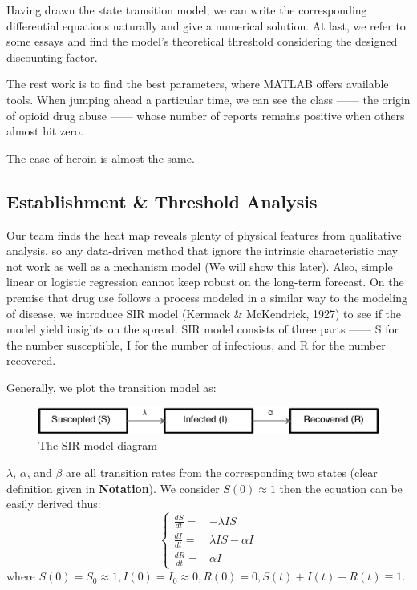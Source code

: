 \documentclass{mcmthesis}
\begin{document}
Having drawn the state transition model, we can write the corresponding differential equations naturally and give a numerical solution. At last, we refer to some essays and find the model's theoretical threshold considering the designed discounting factor. 

The rest work is to find the best parameters, where MATLAB offers available tools. When jumping ahead a particular time, we can see the class —— the origin of opioid drug abuse —— whose number of reports remains positive when others almost hit zero. 

The case of heroin is almost the same.
\subsection{Establishment \& Threshold Analysis}
Our team finds the heat map reveals plenty of physical features from qualitative analysis, so  any data-driven method that ignore the intrinsic characteristic may not work as well as a mechanism model (We will show this later).  Also, simple linear or logistic regression cannot keep robust on the long-term forecast. On the premise that drug use follows a process modeled in a similar way to the modeling of disease, we introduce SIR model (Kermack \& McKendrick, 1927) to see if the model yield insights on the spread. SIR model consists of three parts —— S for the number susceptible, I for the number of infectious, and R for the number recovered. 

Generally, we plot the transition model as:
\begin{figure}[htbp!]
\centering
	\includegraphics[width=12cm]{figures/SIR}
	\caption{The SIR model diagram}
\end{figure}

$\lambda$, $\alpha$, and $\beta$ are all transition rates from the corresponding two states (clear definition given in \textbf{Notation}). We consider $S(0)\approx1$ then the equation can be easily derived thus:
\[\begin{cases}
\tfrac{dS}{dt}= & -\lambda IS\\
\tfrac{dI}{dt}= & \lambda IS-\alpha I\\
\tfrac{dR}{dt}= & \alpha I
\end{cases} \]
where $S(0)=S_0\approx1,I(0)=I_0\approx0,R(0)=0, S(t)+I(t)+R(t)\equiv 1$.
\end{document}

